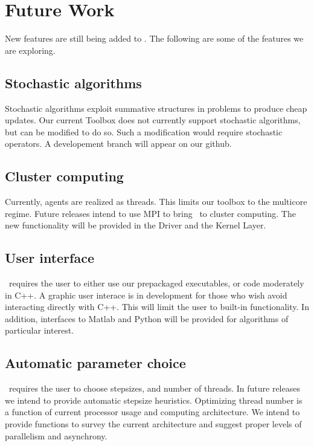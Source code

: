 \section{Future Work}

New features are still being added to \pkg. The following are some of the features we are exploring.

\subsection{Stochastic algorithms} 

Stochastic algorithms exploit summative structures in problems to produce cheap updates. Our current Toolbox does not currently support stochastic algorithms, but can be modified to do so. Such a modification would require stochastic operators. A developement branch will appear on our github.  

\subsection{Cluster computing}
 
 Currently, agents are realized as threads.
 This limits our toolbox to the multicore regime.
 Future releases intend to use MPI to bring \pkg~to cluster computing. The new functionality will be provided in the Driver and the Kernel Layer. 

\subsection{User interface}
 \pkg~requires the user to either use our prepackaged executables, or code moderately in C++.
 A graphic user interace is in development for those who wish avoid interacting directly with C++.
 This will limit the user to built-in functionality.
 In addition, interfaces to Matlab and Python will be provided for algorithms of particular interest.
 
\subsection{Automatic parameter choice}
\pkg~requires the user to choose stepsizes, and number of threads.
In future releases we intend to provide automatic stepsize heuristics. 
Optimizing thread number is a function of current processor usage and computing architecture. 
We intend to provide functions to survey the current architecture and suggest proper levels of parallelism and asynchrony.

